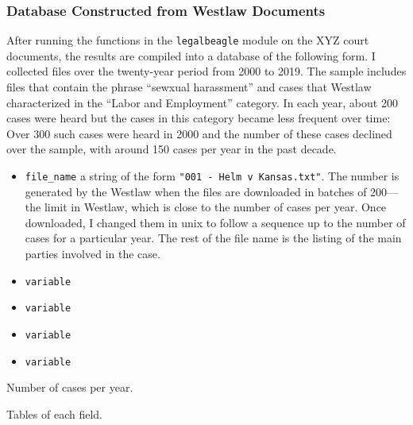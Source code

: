 \documentclass[11pt]{paper}
\begin{document}
\subsubsection*{Database Constructed from Westlaw Documents}

After running the functions in the \texttt{legalbeagle} module on the
XYZ court documents, the results are compiled into a database of the following form. 
I collected files over the twenty-year period from 2000 to 2019. 
The sample includes files that contain the phrase ``sewxual harassment'' and cases that
Westlaw characterized in the ``Labor and Employment'' category. 
In each year,  about 200 cases were heard but the cases in this category became less frequent over time:
Over 300 such cases were heard in 2000 and the number of these cases declined over the sample, 
with around 150 cases per year in the past decade. 

\begin{itemize}
	\item \texttt{file\_name} a string of the form \texttt{"001 - Helm v Kansas.txt"}. 
		The number is generated by the Westlaw when the files are downloaded in batches of 200---%
		the limit in Westlaw, which is close to the number of cases per year. 
		Once downloaded, I changed them in unix to follow a sequence up to the number of cases for a particular year. 
		The rest of the file name is the listing of the main parties involved in the case. 

	\item \texttt{variable}

	\item \texttt{variable}

	\item \texttt{variable}

	\item \texttt{variable} 

\end{itemize}


Number of cases per year. 

Tables of each field. 
\end{document}
